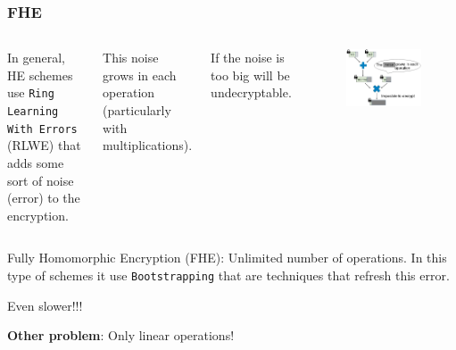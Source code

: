 \documentclass[10pt,handout]{beamer}
\begin{document}



\begin{frame}
    \frametitle{FHE}
  \begin{columns}
      In general, HE schemes use \texttt{Ring Learning With Errors} (RLWE) that  adds some sort of noise (error) to the encryption.

\vspace{0.3cm}
    This noise grows in each operation (particularly with multiplications).

\vspace{0.3cm}
      If the noise is too big will be undecryptable.
        \begin{figure}[h!]
            \centering
            \includegraphics[scale=0.2]{multNoise.jpg}
        \end{figure}



\end{columns}

    Fully Homomorphic Encryption (FHE): Unlimited number of operations. In this type of schemes
    it use \texttt{Bootstrapping} that are techniques that refresh this error.

    Even slower!!!

    \textbf{Other problem}: Only linear operations!
\end{frame}
\end{document}
